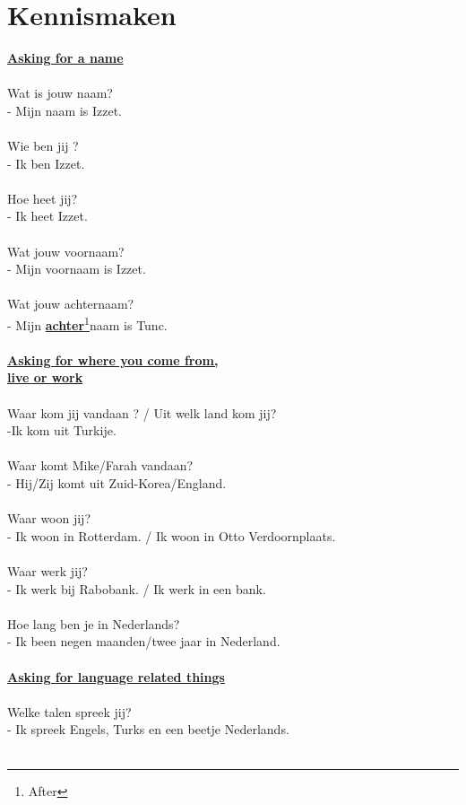 \documentclass[a4paper,14pt]{extarticle}
\newcommand{\note}[2]{\underline{\textbf{#1}}\footnote{#2}}
\newcommand{\emp}[1]{\underline{\textbf{#1}}}
\begin{document}
\section{Kennismaken}
\begin{paracol}{2}
\emp{Asking for a name} \\ \\
Wat is jouw naam? \\
- Mijn naam is Izzet. \\ \\
Wie ben jij ? \\
- Ik ben Izzet. \\ \\
Hoe heet jij? \\
- Ik heet Izzet. \\ \\
Wat jouw voornaam? \\
- Mijn voornaam is Izzet. \\ \\
Wat jouw achternaam? \\
- Mijn \note{achter}{After}naam is Tunc. \\ \\
\emp{Asking for where you come from,} \\
\emp{live or work} \\ \\
Waar kom jij vandaan ? / Uit welk land kom jij? \\
-Ik kom uit Turkije. \\ \\
Waar komt Mike/Farah vandaan? \\
- Hij/Zij komt uit Zuid-Korea/England. \\ \\
Waar woon jij? \\
- Ik woon in Rotterdam. / Ik woon in Otto Verdoornplaats. \\ \\
Waar werk jij? \\
- Ik werk bij Rabobank. / Ik werk in een bank. \\ \\
Hoe lang ben je in Nederlands? \\
- Ik been negen maanden/twee jaar in Nederland. \\ \\
\switchcolumn
\emp{Asking for language related things} \\ \\
Welke talen spreek jij? \\
- Ik spreek Engels, Turks en een beetje Nederlands. \\ \\

\end{paracol}
\end{document}
